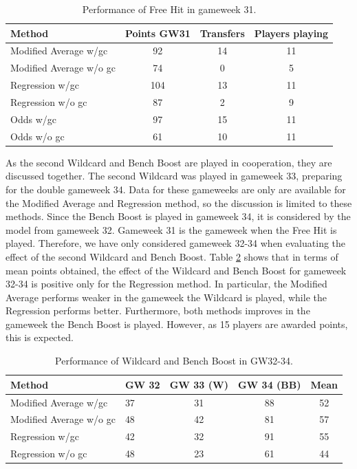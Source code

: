 \begin{table}[H]
\centering
\begin{tabular}{@{}lccc@{}}
\toprule
Method                  & Points GW31 & Transfers  & Players playing \\ \midrule
Modified Average w/gc   & 92          & 14         & 11              \\
Modified Average w/o gc & 74          & 0  & 5               \\
Regression w/gc         & 104         & 13         & 11              \\
Regression w/o gc       & 87          & 2  & 9               \\
Odds w/gc               & 97          & 15         & 11              \\
Odds w/o gc             & 61          & 10  & 11              \\ \bottomrule
\end{tabular}
\caption{Performance of Free Hit in gameweek 31.}
\label{tab:performance_free_hit}
\end{table}


\newpar

As the second Wildcard and Bench Boost are played in cooperation, they are discussed together. The second Wildcard was played in gameweek 33, preparing for the double gameweek 34. Data for these gameweeks are only are available for the Modified Average and Regression method, so the discussion is limited to these methods. Since the Bench Boost is played in gameweek 34, it is considered by the model from gameweek 32. Gameweek 31 is the gameweek when the Free Hit is played. Therefore, we have only considered gameweek 32-34 when evaluating the effect of the second Wildcard and Bench Boost. Table \ref{tab:performance_wildcard_and_bench_boost} shows that in terms of mean points obtained, the effect of the Wildcard and Bench Boost for gameweek 32-34 is positive only for the Regression method. In particular, the Modified Average performs weaker in the gameweek the Wildcard is played, while the Regression performs better. Furthermore, both methods improves in the gameweek the Bench Boost is played. However, as 15 players are awarded points, this is expected.


\begin{table}[H]
\centering
\begin{tabular}{@{}llccc@{}}
\toprule
Method                  & GW 32 & GW 33 (W) & GW 34 (BB) & Mean \\ \midrule
Modified Average w/gc   & 37    & 31        & 88         & 52   \\
Modified Average w/o gc & 48    & 42        & 81         & 57   \\
Regression w/gc         & 42    & 32        & 91         & 55   \\
Regression w/o gc       & 48    & 23        & 61         & 44   \\ \bottomrule
\end{tabular}
\caption{Performance of Wildcard and Bench Boost in GW32-34.}
\label{tab:performance_wildcard_and_bench_boost}
\end{table}






